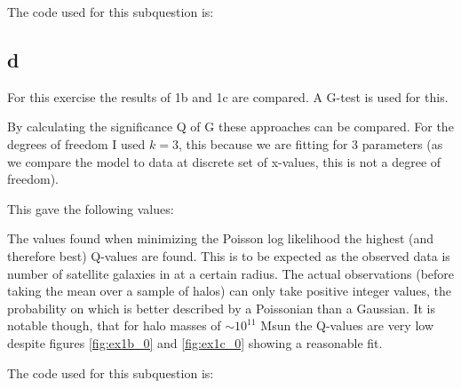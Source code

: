 The code used for this subquestion is:


\subsection*{d}
For this exercise the results of 1b and 1c are compared.
A G-test is used for this.

By calculating the significance Q of G these approaches can be compared.
For the degrees of freedom I used $k=3$, this because we are fitting for 3 parameters (as we compare the model to data at discrete set of x-values, this is not a degree of freedom).

This gave the following values:


The values found when minimizing the Poisson log likelihood the highest (and therefore best) Q-values are found.
This is to be expected as the observed data is number of satellite galaxies in at a certain radius.
The actual observations (before taking the mean over a sample of halos) can only take positive integer values, the probability on which is better described by a Poissonian than a Gaussian.
It is notable though, that for halo masses of $\sim 10^{11}$ Msun the Q-values are very low despite figures \ref{fig:ex1b_0} and \ref{fig:ex1c_0} showing a reasonable fit.

The code used for this subquestion is:
